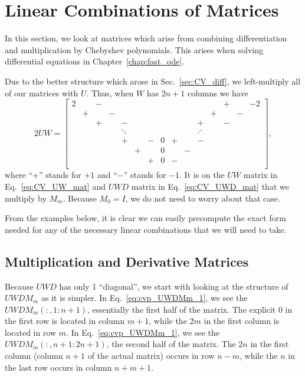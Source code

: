 \section{Linear Combinations of \CV{} Matrices}
\label{sec:CV_lin_comb}

In this section, we look at matrices which arise from
combining differentiation and multiplication by Chebyshev polynomials.
This arises when solving differential equations in Chapter~\ref{chap:fast_ode}.

Due to the better structure which arose in Sec.~\ref{sec:CV_diff},
we left-multiply all of our \CV{} matrices with $U$.
Thus, when $W$ has $2n+1$ columns we have
%
\begin{equation}
    2UW = \begin{bmatrix}
        2 &   & - &   &   &   &   &   &   &   &   &   & + &   & -2 \\
          & + &   & - &   &   &   &   &   &   &   & + &   & - & \\ 
          &   & + &   & - &   &   &   &   &   & + &   & - &   & \\
          &   &  & &\ddots&   &   &   & & &\iddots&   &   &   & \\
          &   &   &   & + &   & - & 0 & + &   & - &   &   &   & \\
          &   &   &   &   & + &   & 0 &   & - &   &   &   &   & \\
          &   &   &   &   &   & + & 0 & - &   &   &   &   &   & \\
    \end{bmatrix},
    \label{eq:CV_UW_mat}
\end{equation}
%
where ``$+$'' stands for $+1$ and ``$-$'' stands for $-1$.
It is on the $UW$ matrix in Eq.~\eqref{eq:CV_UW_mat} and $UWD$ matrix
in Eq.~\eqref{eq:CV_UWD_mat} that we multiply by $M_{m}$.
Because $M_{0} = I$, we do not need to worry about that case.

From the examples below, it is clear we can easily precompute
the exact form needed for any of the necessary linear combinations
that we will need to take.

\subsection{Multiplication and Derivative \CV{} Matrices}

Because $UWD$ has only 1 ``diagonal'', we start with looking
at the structure of $UWDM_{m}$ as it is simpler.
In Eq.~\eqref{eq:cvp_UWDMm_1}, we see the $UWDM_{m}(:,1:n+1)$,
essentially the first half of the matrix.
The explicit $0$ in the first row is located in column $m+1$,
while the $2m$ in the first column is located in row $m$.
In Eq.~\eqref{eq:cvp_UWDMm_1}, we see the $UWDM_{m}(:,n+1:2n+1)$,
the second half of the matrix.
The $2n$ in the first column (column $n+1$ of the actual matrix)
occurs in row $n-m$, while the $n$ in the last row
occurs in column $n+m+1$.

